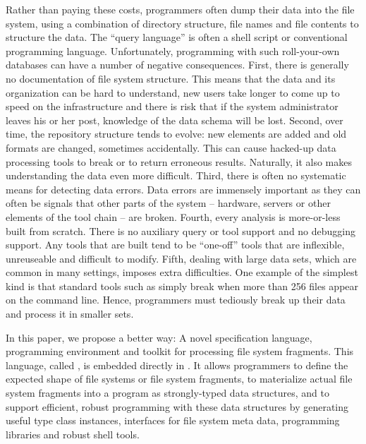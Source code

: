 Rather than paying these costs, programmers often 
dump their data into the file system, using a combination of
directory structure, file names and file contents
to structure the data.  The ``query language'' is often a shell script
or conventional programming language.  
Unfortunately, programming with such roll-your-own 
databases can have a number of negative consequences.  
First, there is generally no documentation
of file system structure.  This means that the data and its organization
can be hard to understand,
new users take longer to come up to speed on the infrastructure and there
is risk that if the system administrator leaves his or her post, knowledge
of the data schema will be lost.  Second, over time, the repository
structure tends to evolve: new elements are added and old formats are changed,
sometimes accidentally.  This can cause hacked-up data processing
tools to break or to return erroneous results. Naturally, it also makes
understanding the data even more difficult.  Third, there is often no 
systematic means for detecting data errors.  Data errors are immensely
important as they can often be signals that other parts of the system --
hardware, servers or other elements of the tool chain -- are broken.
Fourth, every analysis is more-or-less
built from scratch.  There is no auxiliary 
query or tool support and no debugging support.  Any tools that are
built tend to be ``one-off'' tools that are inflexible, unreuseable
and difficult to modify.  Fifth, dealing with large data sets, which
are common in many settings, imposes extra difficulties.  One example
of the simplest kind is that standard tools 
such as  simply break when more than 256 files appear on the
command line.  Hence, programmers must tediously break up their data
and process it in smaller sets.  

In this paper, we propose a better way:  A novel specification language,
programming environment and toolkit for processing file system fragments.
This language, called \forest{}, is embedded directly in \haskell{}.
%
It allows programmers to define the expected shape of file systems or
file system fragments, to materialize actual file system fragments
into a \haskell{} program as strongly-typed 
\haskell{} data structures, and to support efficient, robust 
programming with these
data structures by generating useful type class instances, interfaces for
file system meta data, programming libraries
and robust shell tools.  

